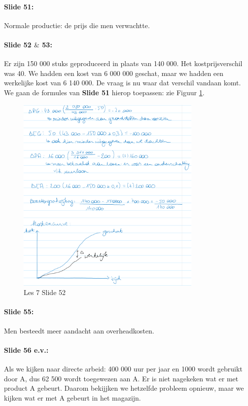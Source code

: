 \documentclass[10pt,a4paper]{report}
\begin{document}
\paragraph{Slide 51:} Normale productie: de prijs die men verwachtte.

\paragraph{Slide 52 $\&$ 53:} Er zijn 150 000 stuks geproduceerd in plaats van 140 000. Het kostprijsverschil was 40. We hadden een kost van 6 000 000 geschat, maar we hadden een werkelijke kost van 6 140 000. De vraag is nu waar dat verschil vandaan komt. We gaan de formules van \textbf{Slide 51} hierop toepassen: zie Figuur \ref{les07_01}.

\begin{figure}[h!]
\centering
\includegraphics[width=90mm]{Les07_01.png}
\caption{Les 7 Slide 52} 
\label{les07_01}
\end{figure}

\paragraph{Slide 55:} Men besteedt meer aandacht aan overheadkosten.

\paragraph{Slide 56 e.v.:} Als we kijken naar directe arbeid: 400 000 uur per jaar en 1000 wordt gebruikt door A, dus 62 500 wordt toegewezen aan A. Er is niet nagekeken wat er met product A gebeurt. Daarom bekijjken we hetzelfde probleem opnieuw, maar we kijken wat er met A gebeurt in het magazijn.
\end{document}
